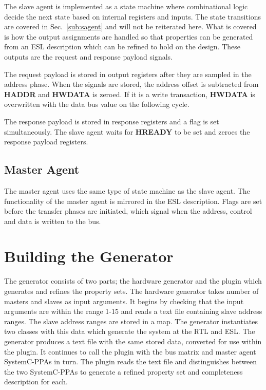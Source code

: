 The slave agent is implemented as a state machine where combinational logic decide the next state based on internal registers and inputs. The state transitions are covered in Sec.~\ref{sub:sagent} and will not be reiterated here. What is covered is how the output assignments are handled so that properties can be generated from an ESL description which can be refined to hold on the design. These outputs are the request and response payload signals. \par
The request payload is stored in output registers after they are sampled in the address phase. When the signals are stored, the address offset is subtracted from \textbf{HADDR} and \textbf{HWDATA} is zeroed. If it is a write transaction, \textbf{HWDATA} is overwritten with the data bus value on the following cycle. \par
The response payload is stored in response registers and a flag is set simultaneously. The slave agent waits for \textbf{HREADY} to be set and zeroes the response payload registers.  



\subsection{Master Agent}
The master agent uses the same type of state machine as the slave agent. The functionality of the master agent is mirrored in the ESL description. Flags are set before the transfer phases are initiated, which signal when the address, control and data is written to the bus. 


\section{Building the Generator}
The generator consists of two parts; the hardware generator and the plugin which generates and refines the property sets. The hardware generator takes number of masters and slaves as input arguments. It begins by checking that the input arguments are within the range 1-15 and reads a text file containing slave address ranges. The slave address ranges are stored in a map. The generator instantiates two classes with this data which generate the system at the RTL and ESL. The generator produces a text file with the same stored data, converted for use within the plugin. It continues to call the plugin with the bus matrix and master agent SystemC-PPAs in turn. The plugin reads the text file and distinguishes between the two SystemC-PPAs to generate a refined property set and completeness description for each. 

